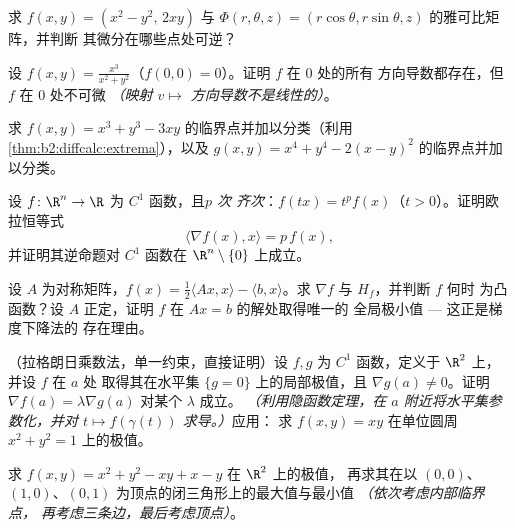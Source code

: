 \begin{exercise}[$\star$]\label{exo:b2:diffcalc:1}
求 $f(x,y) = (x^2 - y^2,\, 2xy)$ 与
$\Phi(r,\theta,z) = (r\cos\theta, r\sin\theta, z)$ 的雅可比矩阵，并判断
其微分在哪些点处可逆？
\end{exercise}

\begin{exercise}[$\star$]\label{exo:b2:diffcalc:2}
设 $f(x,y) = \frac{x^3}{x^2 + y^2}$（$f(0,0) = 0$）。证明 $f$ 在 $0$ 处的所有
方向导数都存在，但 $f$ 在 $0$ 处不可微
\emph{（映射 $v \mapsto$
方向导数不是线性的）}。
\end{exercise}

\begin{exercise}[$\star$]\label{exo:b2:diffcalc:3}
求 $f(x, y) = x^3 + y^3 -
3xy$ 的临界点并加以分类（利用\cref{thm:b2:diffcalc:extrema}），以及 $g(x,y) = x^4 +
y^4 - 2(x - y)^2$ 的临界点并加以分类。
\end{exercise}

\begin{exercise}[$\star\star$]\label{exo:b2:diffcalc:4}
设 $f \colon \R^n \to \R$ 为 $C^1$ 函数，且\emph{$p$ 次
齐次}：$f(tx) = t^pf(x)$（$t > 0$）。证明欧拉恒等式
\[
\langle \nabla f(x), x\rangle = p\,f(x) ,
\]
并证明其逆命题对 $C^1$ 函数在 $\R^n\setminus\{0\}$ 上成立。
\end{exercise}

\begin{exercise}[$\star\star$]\label{exo:b2:diffcalc:5}
设 $A$ 为对称矩阵，$f(x) = \frac12\langle Ax, x\rangle -
\langle b, x\rangle$。求 $\nabla f$ 与 $H_f$，并判断 $f$ 何时
为凸函数？设 $A$ 正定，证明 $f$ 在 $Ax = b$ 的解处取得唯一的
全局极小值 --- 这正是梯度下降法的
存在理由。
\end{exercise}

\begin{exercise}[$\star\star$]\label{exo:b2:diffcalc:6}
（拉格朗日乘数法，单一约束，直接证明）设 $f, g$ 为 $C^1$
函数，定义于 $\R^2$ 上，并设 $f$ 在 $a$ 处
取得其在水平集 $\{g = 0\}$ 上的局部极值，且 $\nabla g(a) \neq 0$。证明
$\nabla f(a) = \lambda\nabla g(a)$ 对某个 $\lambda$ 成立。
\emph{（利用隐函数定理，在 $a$ 附近将水平集参数化，并对
$t \mapsto f(\gamma(t))$ 求导。）}应用：
求 $f(x,y) = xy$ 在单位圆周 $x^2 + y^2 = 1$ 上的极值。
\end{exercise}

\begin{exercise}[$\star\star$]\label{exo:b2:diffcalc:7}
求 $f(x, y) = x^2 + y^2 - xy + x - y$ 在 $\R^2$ 上的极值，
再求其在以 $(0,0)$、$(1,0)$、$(0,1)$ 为顶点的闭三角形上的最大值与最小值
\emph{（依次考虑内部临界点，
再考虑三条边，最后考虑顶点）}。
\end{exercise}

